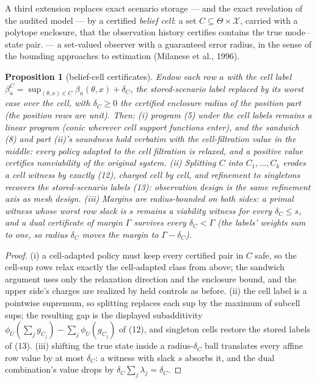 \documentclass[10pt,twocolumn]{article}
\theoremstyle{plain}
\newtheorem{proposition}[theorem]{Proposition}
\theoremstyle{definition}
\theoremstyle{remark}
\begin{document}
A third extension replaces exact scenario storage --- and the exact
revelation of the audited model --- by a certified \emph{belief cell}: a
set \(C \subseteq \Theta \times \mathcal{X}\), carried with a polytope
enclosure, that the observation history certifies contains the true
mode--state pair. --- a set-valued observer with a guaranteed error radius, in the sense
of the bounding approaches to estimation (Milanese et al., 1996).

\begin{proposition}[belief-cell certificates]\label{lp-prop:beliefcells}
Endow each row \(a\) with the cell label
\(\beta_a^{C} = \sup_{(\theta,x) \in C} \beta_a(\theta,x) +
\delta_C\), the stored-scenario label replaced by its worst case over the
cell, with \(\delta_C \ge 0\) the certified enclosure radius of the
position part (the position rows are unit). Then:
\emph{(i)} program (5) under the cell labels remains a linear program
(conic wherever cell support functions enter), and the sandwich (8) and
part (ii)'s soundness hold verbatim with the cell-filtration value in the
middle: every policy adapted to the cell filtration is relaxed, and a
positive value certifies nonviability of the original system.
\emph{(ii)} Splitting \(C\) into \(C_1, \dots, C_k\) erodes a cell
witness by exactly (12), charged cell by cell, and refinement to singletons
recovers the stored-scenario labels (13): observation design is the same
refinement axis as mesh design. \emph{(iii)} Margins are radius-bounded on
both sides: a primal witness whose worst row slack is \(s\) remains a
viability witness for every \(\delta_C \le s\), and a dual certificate
of margin \(\Gamma\) survives every \(\delta_C < \Gamma\) (the
labels' weights sum to one, so radius \(\delta_C\) moves the margin to
\(\Gamma - \delta_C\)).
\end{proposition}

\begin{proof}
(i) a cell-adapted policy must keep every certified pair in \(C\) safe, so
the cell-sup rows relax exactly the cell-adapted class from above; the
sandwich argument uses only the relaxation direction and the enclosure
bound, and the upper side's charges are realized by held controls as before.
(ii) the cell label is a pointwise supremum, so splitting replaces each sup
by the maximum of subcell sups; the resulting gap is the displayed
subadditivity \(\phi_U(\sum_j g_{C_j}) - \sum_j \phi_U(g_{C_j})\) of
(12), and singleton cells restore the stored labels of (13). (iii) shifting
the true state inside a radius-\(\delta_C\) ball translates every affine
row value by at most \(\delta_C\): a witness with slack \(s\) absorbs
it, and the dual combination's value drops by \(\delta_C \sum_j
\lambda_j = \delta_C\).
\end{proof}
\end{document}
